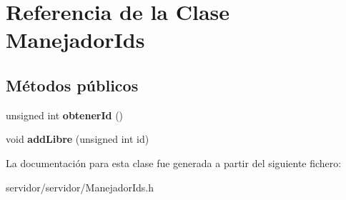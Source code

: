 \hypertarget{classManejadorIds}{\section{\-Referencia de la \-Clase \-Manejador\-Ids}
\label{classManejadorIds}
}
\subsection*{\-Métodos públicos}
\begin{DoxyCompactItemize}
\item 
\hypertarget{classManejadorIds_aeb03f1886279d35f05f74435fcceedd5}{unsigned int {\bfseries obtener\-Id} ()}\label{classManejadorIds_aeb03f1886279d35f05f74435fcceedd5}

\item 
\hypertarget{classManejadorIds_a3027e89104337579c4d7a96d2ff2ef75}{void {\bfseries add\-Libre} (unsigned int id)}\label{classManejadorIds_a3027e89104337579c4d7a96d2ff2ef75}

\end{DoxyCompactItemize}


\-La documentación para esta clase fue generada a partir del siguiente fichero\-:\begin{DoxyCompactItemize}
\item 
servidor/servidor/\-Manejador\-Ids.\-h\end{DoxyCompactItemize}
